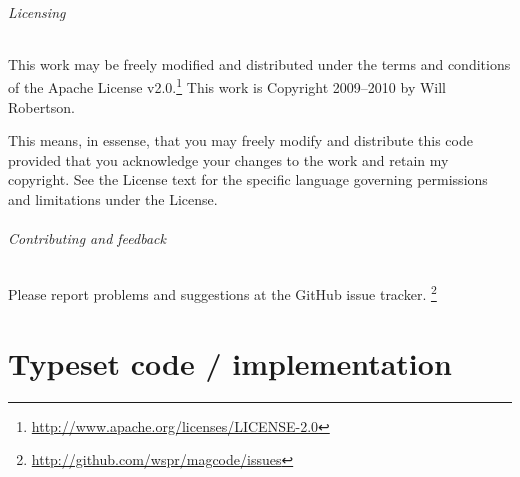 \documentclass{article}
\begin{document}
\paragraph{Licensing}
This work may be freely modified and distributed under the terms and conditions of the Apache License v2.0.\footnote{\url{http://www.apache.org/licenses/LICENSE-2.0}}
This work is Copyright 2009--2010 by Will Robertson.

This means, in essense, that you may freely modify and distribute this
code provided that you acknowledge your changes to the work and retain
my copyright. See the License text for the specific language governing
permissions and limitations under the License.

\paragraph{Contributing and feedback}
Please report problems and suggestions at the GitHub issue tracker.%
\footnote{\url{http://github.com/wspr/magcode/issues}}

\printbibliography

\clearpage
\part{Typeset code / implementation}


\end{document}
